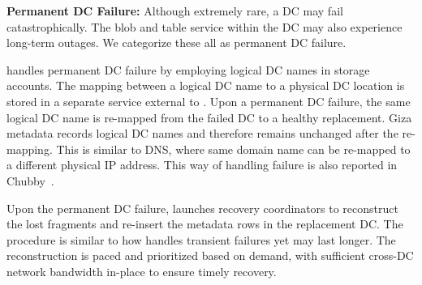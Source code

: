 
{\bf Permanent DC Failure:} Although extremely rare, a DC may fail
catastrophically. The blob and table service within the DC may also experience
long-term outages. We categorize these all as permanent DC failure.

\name handles permanent DC failure by employing logical DC names in storage accounts. The mapping between a logical DC name to a physical DC location is stored in a separate service external to \name. Upon a permanent DC failure, the same logical DC name is re-mapped from the failed DC to a healthy replacement. Giza metadata records logical DC names and therefore remains unchanged after the re-mapping. This is similar to DNS, where same domain name can be re-mapped to a different physical IP address. This way of handling failure is also reported in Chubby~\cite{chubby:osdi06}.

Upon the permanent DC failure, \name launches recovery coordinators to
reconstruct the lost fragments and re-insert the metadata rows in the
replacement DC. The procedure is similar to how \name handles transient failures
yet may last longer. The reconstruction is paced and prioritized based on
demand, with sufficient cross-DC network bandwidth in-place to ensure timely
recovery.




